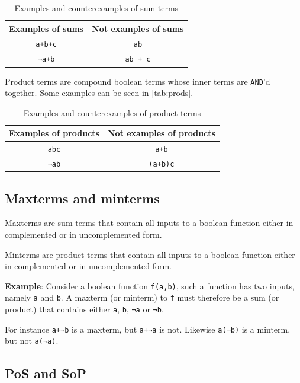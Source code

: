 \documentclass[a4paper,11pt]{report}
\newcommand{\enot}{¬}
\begin{document}
\begin{table}[H]
  \centering
  \begin{tabular}{c | c}
    \textbf{Examples of sums} & \textbf{Not examples of sums} \\ \hline
    \texttt{a+b+c}      & \texttt{ab} \\
    \texttt{\enot{a}+b} & \texttt{ab + c}
  \end{tabular}
  \caption[Examples of sum terms]{Examples and counterexamples of sum
    terms}%
\label{tab:sums}
\end{table}

Product terms are compound boolean terms whose inner terms are
\texttt{AND}'d together. Some examples can be seen in
\autoref{tab:prods}.

\begin{table}[H]
  \centering
  \begin{tabular}{c | c}
    \textbf{Examples of products} & \textbf{Not examples of products} \\ \hline
    \texttt{abc}      & \texttt{a+b} \\
    \texttt{\enot{a}b} & \texttt{(a+b)c}
  \end{tabular}
  \caption[Example of product terms]{Examples and counterexamples of
    product terms}%
  \label{tab:prods}
\end{table}

\subsection{Maxterms and minterms}

Maxterms are sum terms that contain all inputs to a boolean function
either in complemented or in uncomplemented form.

Minterms are product terms that contain all inputs to a boolean
function either in complemented or in uncomplemented form.

\textbf{Example}: Consider a boolean function \texttt{f(a,b)}, such a
function has two inputs, namely \texttt{a} and \texttt{b}. A maxterm
(or minterm) to \texttt{f} must therefore be a sum (or product) that
contains either \texttt{a}, \texttt{b}, \texttt{\enot{a}} or
\texttt{\enot{b}}.

For instance \texttt{a+\enot{b}} is a maxterm, but \texttt{a+\enot{a}}
is not. Likewise \texttt{a(\enot{b})} is a minterm, but not
\texttt{a(\enot{a})}.

\subsection{PoS and SoP}
\end{document}
